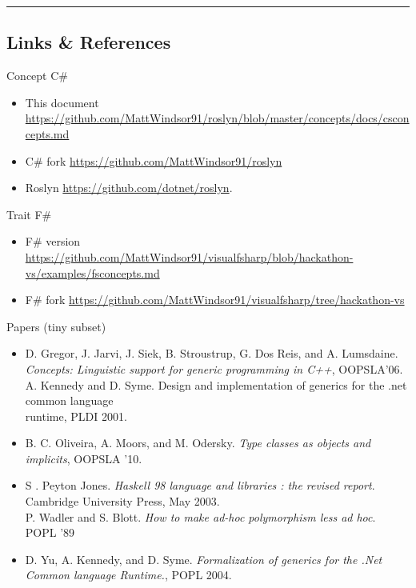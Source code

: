 \begin{center}\rule{0.5\linewidth}{\linethickness}\end{center}

\subsection{Links \& References}\label{links-references}

Concept C\#

\begin{itemize}
\tightlist
\item
  This document
  \url{https://github.com/MattWindsor91/roslyn/blob/master/concepts/docs/csconcepts.md}
\item
  C\# fork \url{https://github.com/MattWindsor91/roslyn}
\item
  Roslyn \url{https://github.com/dotnet/roslyn}.
\end{itemize}

Trait F\#

\begin{itemize}
\tightlist
\item
  F\# version
  \url{https://github.com/MattWindsor91/visualfsharp/blob/hackathon-vs/examples/fsconcepts.md}
\item
  F\# fork
  \url{https://github.com/MattWindsor91/visualfsharp/tree/hackathon-vs}
\end{itemize}

Papers (tiny subset)

\begin{itemize}
\tightlist
\item
  D. Gregor, J. Jarvi, J. Siek, B. Stroustrup, G. Dos Reis, and A.
  Lumsdaine. \emph{Concepts: Linguistic support for generic programming
  in C++}, OOPSLA'06.\\
  A. Kennedy and D. Syme. Design and implementation of generics for the
  .net common language\\
  runtime, PLDI 2001.
\item
  B. C. Oliveira, A. Moors, and M. Odersky. \emph{Type classes as
  objects and implicits}, OOPSLA '10.
\item
  S . Peyton Jones. \emph{Haskell 98 language and libraries : the
  revised report}. Cambridge University Press, May 2003.\\
  P. Wadler and S. Blott. \emph{How to make ad-hoc polymorphism less ad
  hoc}. POPL '89
\item
  D. Yu, A. Kennedy, and D. Syme. \emph{Formalization of generics for
  the .Net Common language Runtime.}, POPL 2004.
\end{itemize}
